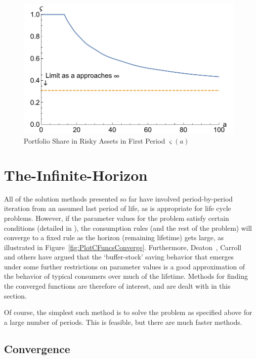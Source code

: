\documentclass[titlepage]{\econtex}
\begin{document}
\hypertarget{PlotRiskySharetOfat}{}
\begin{figure}
  \includegraphics{./Figures/PlotRiskySharetOfat}
  \caption{Portfolio Share in Risky Assets in First Period $\varsigma({a})$}
  \label{fig:PlotRiskySharetOfat}
\end{figure}

\hypertarget{The-Infinite-Horizon}{}
\section{The-Infinite-Horizon}

All of the solution methods presented so far have involved
period-by-period iteration from an assumed last period of life, as is
appropriate for life cycle problems.  However, if the parameter values
for the problem satisfy certain conditions (detailed in
\cite{BufferStockTheory}), the consumption rules (and the rest of
the problem) will converge to a fixed rule as the horizon (remaining
lifetime) gets large, as illustrated in
Figure~\ref{fig:PlotCFuncsConverge}.  Furthermore,
Deaton~\citeyearpar{deatonLiqConstr},
Carroll~\citeyearpar{carroll:brookings,carrollBSLCPIH} and others
have argued that the `buffer-stock' saving behavior that emerges under
some further restrictions on parameter values is a good approximation
of the behavior of typical consumers over much of the lifetime.
Methods for finding the converged functions are therefore of interest,
and are dealt with in this section.

Of course, the simplest such method is to solve the problem as
specified above for a large number of periods.  This is feasible, but
there are much faster methods.

\subsection{Convergence}
\end{document}

